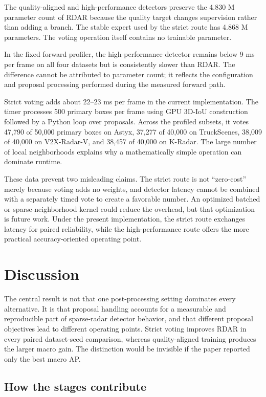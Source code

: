 \documentclass[final,5p,times]{elsarticle}
\begin{document}
The quality-aligned and high-performance detectors preserve the 4.830 M
parameter count of RDAR because the quality target changes supervision rather
than adding a branch. The stable expert used by the strict route has 4.868 M
parameters. The voting operation itself contains no trainable parameter.

In the fixed forward profiler, the high-performance detector remains below
9 ms per frame on all four datasets but is consistently slower than RDAR. The
difference cannot be attributed to parameter count; it reflects the
configuration and proposal processing performed during the measured forward
path.

Strict voting adds about 22--23 ms per frame in the current implementation.
The timer processes 500 primary boxes per frame using GPU 3D-IoU construction
followed by a Python loop over proposals. Across the profiled subsets, it votes
47,790 of 50,000 primary boxes on Astyx, 37,277 of 40,000 on TruckScenes,
38,009 of 40,000 on V2X-Radar-V, and 38,457 of 40,000 on K-Radar. The large
number of local neighborhoods explains why a mathematically simple operation
can dominate runtime.

These data prevent two misleading claims. The strict route is not
``zero-cost'' merely because voting adds no weights, and detector latency
cannot be combined with a separately timed vote to create a favorable number.
An optimized batched or sparse-neighborhood kernel could reduce the overhead,
but that optimization is future work. Under the present implementation, the
strict route exchanges latency for paired reliability, while the
high-performance route offers the more practical accuracy-oriented operating
point.

\section{Discussion}

The central result is not that one post-processing setting dominates every
alternative. It is that proposal handling accounts for a measurable and
reproducible part of sparse-radar detector behavior, and that different
proposal objectives lead to different operating points. Strict voting improves
RDAR in every paired dataset-seed comparison, whereas quality-aligned training
produces the larger macro gain. The distinction would be invisible if the
paper reported only the best macro AP.

\subsection{How the stages contribute}
\end{document}
